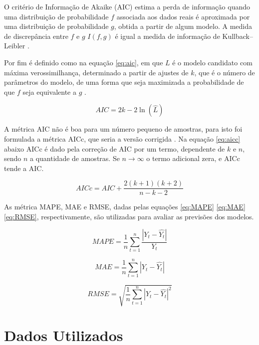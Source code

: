 O critério de Informação de Akaike (AIC) estima a perda de informação quando uma distribuição de probabilidade $f$ associada aos dados reais é aproximada por uma distribuição de probabilidade $g$, obtida a partir de algum modelo. A medida de discrepância entre $f$ e $g$ $I(f,g)$ é igual a medida de informação de Kullback–Leibler \cite{wagenmakers2004aic}.

Por fim é definido como na equação \ref{eq:aic}, em que $L$ é o modelo candidato com máxima verossimilhança, determinado a partir de ajustes de $k$, que é o número de parâmetros do modelo, de uma forma que seja maximizada a probabilidade de que $f$ seja equivalente a $g$ \cite{wagenmakers2004aic}.

\begin{equation}
\label{eq:aic}
    AIC = 2k - 2\ln(\hat L)
\end{equation}

A métrica AIC não é boa para um número pequeno de amostras, para isto foi formulada a métrica AICc, que seria a versão corrigida \cite{hurvich1989regression}. Na equação \ref{eq:aicc} abaixo AICc é dado pela correção de AIC por um termo, dependente de $k$ e $n$, sendo $n$ a quantidade de amostras. Se $n \to \infty$ o termo adicional zera, e AICc tende a AIC. 

\begin{equation}
\label{eq:aicc}
    AICc = AIC + \frac{2(k+1)(k+2)}{n - k -2}
\end{equation}

As métrica MAPE, MAE e RMSE, dadas pelas equações \ref{eq:MAPE} \ref{eq:MAE} \ref{eq:RMSE}, respectivamente, são utilizadas para avaliar as previsões dos modelos. 

\begin{equation}
\label{eq:MAPE}
    MAPE = \frac{1}{n}\sum_{t=1}^{n} \frac{|Y_t - \hat{Y_t}|}{Y_t}
\end{equation}

\begin{equation}
\label{eq:MAE}
    MAE = \frac{1}{n}\sum_{t=1}^{n} |Y_t - \hat{Y_t}|
\end{equation}

\begin{equation}
\label{eq:RMSE}
    RMSE = \sqrt{\frac{1}{n}\sum_{t=1}^{n} |Y_t - \hat{Y_t}|^2}
\end{equation}

\section{Dados Utilizados} 
\label{sec:dados_prep}

